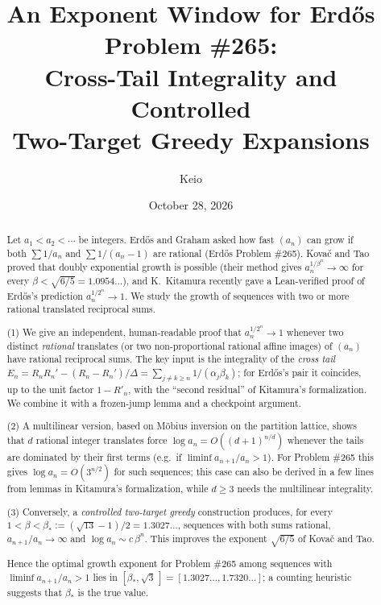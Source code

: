 \documentclass[11pt]{amsart}
\title[An exponent window for Erd\H{o}s Problem \#265]{An Exponent Window for
Erd\H{o}s Problem \#265:\\ Cross-Tail Integrality and Controlled\\ Two-Target Greedy Expansions}
\author{Keio}
\date{October 28, 2026}
\theoremstyle{definition}
\theoremstyle{remark}
\begin{document}
\begin{abstract}
Let $a_1<a_2<\cdots$ be integers. Erd\H{o}s and Graham asked how fast $(a_n)$ can grow
if both $\sum 1/a_n$ and $\sum 1/(a_n-1)$ are rational (Erd\H{o}s Problem \#265).
Kova\v{c} and Tao proved that doubly exponential growth is possible (their method gives
$a_n^{1/\beta^n}\to\infty$ for every $\beta<\sqrt{6/5}=1.0954\ldots$), and K.~Kitamura
recently gave a Lean-verified proof of Erd\H{o}s's prediction $a_n^{1/2^n}\to1$. We study the growth of
sequences with two or more rational translated reciprocal sums.

(1) We give an independent, human-readable proof that $a_n^{1/2^n}\to1$ whenever two
distinct \emph{rational} translates (or two non-proportional rational affine images)
of $(a_n)$ have rational reciprocal sums. The key input is the integrality of the
\emph{cross tail} $E_n=R_nR_n'-(R_n-R_n')/\Delta=\sum_{j\ne k\ge n}1/(\alpha_j\beta_k)$;
for Erd\H{o}s's pair it coincides, up to the unit factor $1-R'_n$, with the ``second
residual'' of Kitamura's formalization. We combine it with a frozen-jump lemma and a
checkpoint argument.

(2) A multilinear version, based on M\"obius inversion on the partition lattice, shows
that $d$ rational integer translates force $\log a_n=O((d+1)^{n/d})$ whenever the tails
are dominated by their first terms (e.g.\ if $\liminf a_{n+1}/a_n>1$). For Problem \#265
this gives $\log a_n=O(3^{n/2})$ for such sequences; this case can also be derived in a
few lines from lemmas in Kitamura's formalization, while $d\ge3$ needs the multilinear
integrality.

(3) Conversely, a \emph{controlled two-target greedy} construction produces, for every
$1<\beta<\beta_*:=(\sqrt{13}-1)/2=1.3027\ldots$, sequences with both sums rational,
$a_{n+1}/a_n\to\infty$ and $\log a_n\sim c\,\beta^n$. This improves the exponent
$\sqrt{6/5}$ of Kova\v{c} and Tao.

Hence the optimal growth exponent for Problem \#265 among sequences with
$\liminf a_{n+1}/a_n>1$ lies in $[\beta_*,\sqrt3\,]=[1.3027\ldots,1.7320\ldots]$; a
counting heuristic suggests that $\beta_*$ is the true value.
\end{abstract}

\maketitle

\tableofcontents

\end{document}
